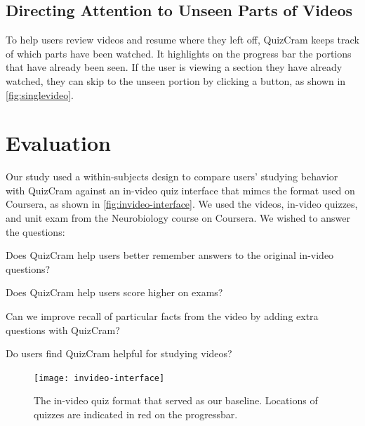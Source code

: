 \documentclass{sigchi}
\begin{document}
\subsection{Directing Attention to Unseen Parts of Videos}

To help users review videos and resume where they left off, QuizCram keeps track of which parts have been watched. It highlights on the progress bar the portions that have already been seen. If the user is viewing a section they have already watched, they can skip to the unseen portion by clicking a button, as shown in \autoref{fig:singlevideo}. %

\section{Evaluation}
Our study used a within-subjects design to compare users' studying behavior with QuizCram against an in-video quiz interface that mimcs the format used on Coursera, as shown in \autoref{fig:invideo-interface}. We used the videos, in-video quizzes, and unit exam from the Neurobiology course on Coursera. We wished to answer the questions:

\begin{compactitem}
\item Does QuizCram help users better remember answers to the original in-video questions?
\item Does QuizCram help users score higher on exams?
\item Can we improve recall of particular facts from the video by adding extra questions with QuizCram?
\item Do users find QuizCram helpful for studying videos?
\end{compactitem}

\begin{figure}
\centering
\texttt{[image: invideo-interface]}
\caption{The in-video quiz format that served as our baseline. Locations of quizzes are indicated in red on the progressbar.}
\label{fig:invideo-interface}
\end{figure}
\end{document}
